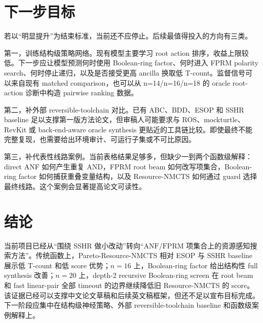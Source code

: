 \documentclass[UTF8,fontset=macnew,11pt]{ctexart}
\newcommand{\method}{Resource-NMCTS}
\newcommand{\pareto}{Pareto-Resource-NMCTS}
\newcommand{\score}{\ensuremath{\mathrm{score}}}
\newcommand{\anf}{\ensuremath{\mathrm{ANF}}}
\newcommand{\fprm}{\ensuremath{\mathrm{FPRM}}}
\begin{document}
\section{下一步目标}

若以“明显提升”为结束标准，当前还不应停止。后续最值得投入的方向有三类。

第一，训练结构级策略网络。现有模型主要学习 root action 排序，收益上限较低。下一步应让模型预测何时使用 Boolean-ring factor、何时进入 FPRM polarity search、何时停止递归，以及是否接受更高 ancilla 换取低 T-count。监督信号可以来自现有 matched comparison，也可以从 n=14/n=16/n=18 的 oracle root-action 诊断中构造 pairwise ranking 数据。

第二，补外部 reversible-toolchain 对比。已有 ABC、BDD、ESOP 和 SSHR baseline 足以支撑第一版方法论文，但审稿人可能要求与 ROS、mockturtle、RevKit 或 back-end-aware oracle synthesis 更贴近的工具链比较。即使最终不能完整复现，也需要给出环境审计、可运行子集或不可比原因。

第三，补代表性线路案例。当前表格结果足够多，但缺少一到两个函数级解释：direct ANF 如何产生重复 AND，FPRM root beam 如何改写项集合，Boolean-ring factor 如何捕获重叠变量结构，以及 \method{} 如何通过 guard 选择最终线路。这个案例会显著提高论文可读性。

\section{结论}

当前项目已经从“围绕 SSHR 做小改动”转向“\anf{}/\fprm{} 项集合上的资源感知搜索方法”。传统函数上，\pareto{} 相对 ESOP 与 SSHR baseline 展示低 T-count 和低 \score{} 优势；$n=16$ 上，Boolean-ring factor 给出结构性 full synthesis 改善；$n=20$ 上，depth-2 recursive Boolean-ring screen 在 root beam 和 fast linear-pair 全部 timeout 的边界继续降低旧 \method{} 的 score。该证据已经可以支撑中文论文草稿和后续英文稿框架，但还不足以宣布目标完成。下一阶段应集中在结构级神经策略、外部 reversible-toolchain baseline 和函数级案例解释上。
\end{document}
